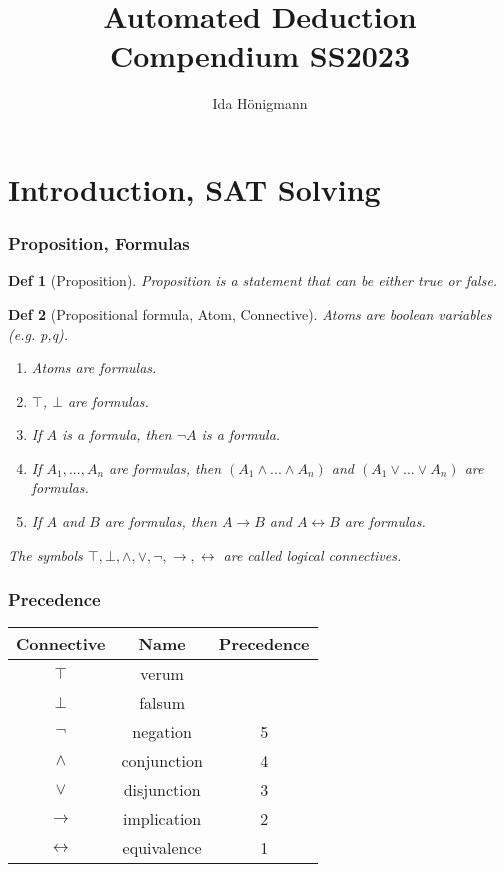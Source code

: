 \documentclass[]{article}
\newtheorem*{definition*}{Def}
\begin{document}
	
\title{Automated Deduction Compendium SS2023}
\author{Ida Hönigmann}

\maketitle

\section{Introduction, SAT Solving}

\subsubsection{Proposition, Formulas}
\begin{definition*}[Proposition]
	Proposition is a statement that can be either true or false.
\end{definition*}

\begin{definition*}[Propositional formula, Atom, Connective]
	Atoms are boolean variables (e.g. p,q).
	
	\begin{enumerate}
		\item Atoms are formulas.
		\item $\top$, $\bot$ are formulas.
		\item If $A$ is a formula, then $\lnot A$ is a formula.
		\item If $A_1, ..., A_n$ are formulas, then $(A_1 \land ... \land A_n)$ and $(A_1 \lor ... \lor A_n)$ are formulas.
		\item If $A$ and $B$ are formulas, then $A \rightarrow B$ and $A \leftrightarrow B$ are formulas.
	\end{enumerate}

	The symbols $\top, \bot, \land, \lor, \lnot, \rightarrow, \leftrightarrow$ are called logical connectives.
\end{definition*}

\subsubsection{Precedence}
\begin{center}
	\begin{tabular}{|c c c|}
		\hline
		Connective & Name & Precedence \\
		\hline
		$\top$            & verum       &   \\  
		$\bot$            & falsum      &   \\
		$\lnot$           & negation    & 5 \\  
		$\land$           & conjunction & 4 \\
		$\lor$            & disjunction & 3 \\  
		$\rightarrow$     & implication & 2 \\
		$\leftrightarrow$ & equivalence & 1 \\  
		\hline
	\end{tabular}
\end{center}
\end{document}
